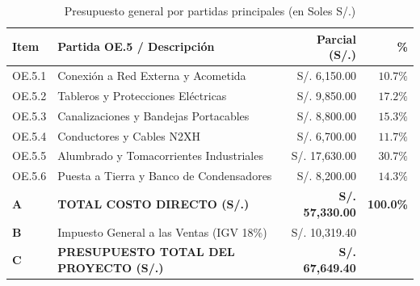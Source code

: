 \begin{table}[H]
\centering
\caption{Presupuesto general por partidas principales (en Soles S/.)}
\begin{tabular}{llrr}
\toprule
\textbf{Item} & \textbf{Partida OE.5 / Descripción} & \textbf{Parcial (S/.)} & \textbf{\%} \\
\midrule
OE.5.1 & Conexión a Red Externa y Acometida & S/. 6,150.00 & $10.7\%$ \\
OE.5.2 & Tableros y Protecciones Eléctricas & S/. 9,850.00 & $17.2\%$ \\
OE.5.3 & Canalizaciones y Bandejas Portacables & S/. 8,800.00 & $15.3\%$ \\
OE.5.4 & Conductores y Cables N2XH & S/. 6,700.00 & $11.7\%$ \\
OE.5.5 & Alumbrado y Tomacorrientes Industriales & S/. 17,630.00 & $30.7\%$ \\
OE.5.6 & Puesta a Tierra y Banco de Condensadores & S/. 8,200.00 & $14.3\%$ \\
\midrule
\textbf{A} & \textbf{TOTAL COSTO DIRECTO (S/.)} & \textbf{S/. 57,330.00} & \textbf{100.0\%} \\
\textbf{B} & Impuesto General a las Ventas (IGV 18\%) & S/. 10,319.40 & \\
\midrule
\textbf{C} & \textbf{PRESUPUESTO TOTAL DEL PROYECTO (S/.)} & \textbf{S/. 67,649.40} & \\
\bottomrule
\end{tabular}
\end{table}
